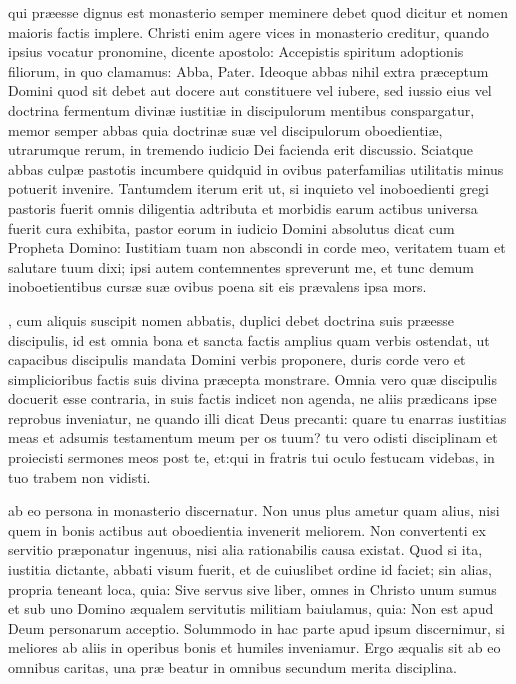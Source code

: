 \documentclass[fontsize=9pt,paper=A6,twoside,BCOR=1mm,DIV=22,headinclude]{scrarticle}
\begin{document}
\begin{multicols}{2}

 qui præesse dignus est monasterio semper meminere debet quod dicitur et nomen maioris factis implere. Christi enim agere vices in monasterio creditur, quando ipsius vocatur pronomine, dicente apostolo: Accepistis spiritum adoptionis filiorum, in quo clamamus: Abba, Pater. Ideoque abbas nihil extra præceptum Domini quod sit debet aut docere aut constituere vel iubere, sed iussio eius vel doctrina fermentum divinæ iustitiæ in discipulorum mentibus conspargatur, memor semper abbas quia doctrinæ suæ vel discipulorum oboedientiæ, utrarumque rerum, in tremendo iudicio Dei facienda erit discussio. Sciatque abbas culpæ pastotis incumbere quidquid in ovibus paterfamilias utilitatis minus potuerit invenire. Tantumdem iterum erit ut, si inquieto vel inoboedienti gregi pastoris fuerit omnis diligentia adtributa et morbidis earum actibus universa fuerit cura exhibita, pastor eorum in iudicio Domini absolutus dicat cum Propheta Domino: Iustitiam tuam non abscondi in corde meo, veritatem tuam et salutare tuum dixi; ipsi autem contemnentes spreverunt me, et tunc demum inoboetientibus cursæ suæ ovibus poena sit eis prævalens ipsa mors.


, cum aliquis suscipit nomen abbatis, duplici debet doctrina suis præesse discipulis, id est omnia bona et sancta factis amplius quam verbis ostendat, ut capacibus discipulis mandata Domini verbis proponere, duris corde vero et simplicioribus factis suis divina præcepta monstrare. Omnia vero quæ discipulis docuerit esse contraria, in suis factis indicet non agenda, ne aliis prædicans ipse reprobus inveniatur, ne quando illi dicat Deus precanti: quare tu enarras iustitias meas et adsumis testamentum meum per os tuum? tu vero odisti disciplinam et proiecisti sermones meos post te, et:qui in fratris tui oculo festucam videbas, in tuo trabem non vidisti.


 ab eo persona in monasterio discernatur. Non unus plus ametur quam alius, nisi quem in bonis actibus aut oboedientia invenerit meliorem. Non convertenti ex servitio præponatur ingenuus, nisi alia rationabilis causa existat. Quod si ita, iustitia dictante, abbati visum fuerit, et de cuiuslibet ordine id faciet; sin alias, propria teneant loca, quia: Sive servus sive liber, omnes in Christo unum sumus et sub uno Domino æqualem servitutis militiam baiulamus, quia: Non est apud Deum personarum acceptio. Solummodo in hac parte apud ipsum discernimur, si meliores ab aliis in operibus bonis et humiles inveniamur. Ergo æqualis sit ab eo omnibus caritas, una præ beatur in omnibus secundum merita disciplina.


\end{multicols}
\end{document}
